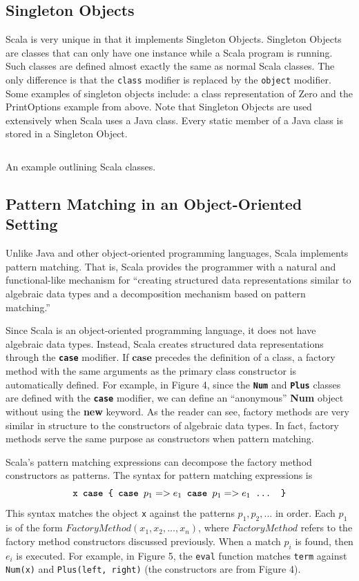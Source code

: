 \documentclass[jou,apacite]{IEEEtran}
\begin{document}
\subsection{Singleton Objects}
\label{sec:singleton-objects}

Scala is very unique in that it implements Singleton Objects. Singleton Objects
are classes that can only have one instance while a Scala program is
running. Such classes are defined almost exactly the same as normal Scala
classes. The only difference is that the \texttt{class} modifier is replaced by
the \texttt{object} modifier. Some examples of singleton objects include: a
class representation of Zero and the PrintOptions example from above. Note that
Singleton Objects are used extensively when Scala uses a Java class. Every
static member of a Java class is stored in a Singleton Object.

\begin{listing}
  \inputminted{Scala}{../examples/Nat.scala}
  \caption{An example outlining Scala classes.}
  \label{lst:nats-example}
\end{listing}

\subsection{Pattern Matching in an Object-Oriented Setting}
Unlike Java and other object-oriented programming languages, Scala implements
pattern matching. That is, Scala provides the programmer with a natural and
functional-like mechanism for ``creating structured data representations similar
to algebraic data types and a decomposition mechanism based on pattern
matching.''

Since Scala is an object-oriented programming language, it does not have
algebraic data types. Instead, Scala creates structured data representations
through the \texttt{\textbf{case}} modifier. If $\textbf{case}$ precedes the
definition of a class, a factory method with the same arguments as the primary
class constructor is automatically defined. For example, in Figure 4, since the
\texttt{\textbf{Num}} and \texttt{\textbf{Plus}} classes are defined with the
\texttt{\textbf{case}} modifier, we can define an “anonymous” \textbf{Num}
object without using the \textbf{new} keyword. As the reader can see, factory
methods are very similar in structure to the constructors of algebraic data
types. In fact, factory methods serve the same purpose as constructors when
pattern matching.

Scala's pattern matching expressions can decompose the factory method
constructors as patterns. The syntax for pattern matching expressions is
\[                              %
    \texttt{x \textbf{case} \{ \textbf{case} $p_1 => e_1$ \textbf{case} $p_1 => e_1$ ... \}}
\]
This syntax matches the object \texttt{x} against the patterns $p_1, p_2, ...$
in order. Each $p_1$ is of the form $FactoryMethod(x_1, x_2, …, x_n)$, where
$FactoryMethod$ refers to the factory method constructors discussed
previously. When a match $p_i$ is found, then $e_i$ is executed. For example, in
Figure 5, the \texttt{eval} function matches \texttt{term} against
\texttt{Num(x)} and \texttt{Plus(left, right)} (the constructors are from Figure
4).
\end{document}

